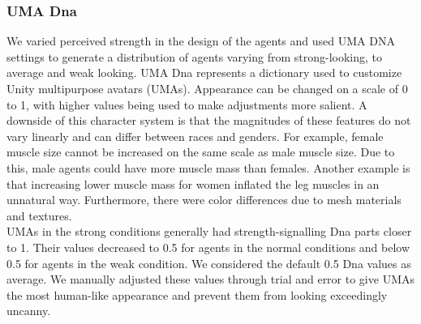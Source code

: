 \subsubsection{UMA Dna}
We varied perceived strength in the design of the agents and used UMA DNA settings to generate a distribution of agents varying from strong-looking, to average and weak looking. UMA Dna represents a dictionary used to customize Unity multipurpose avatars (UMAs). Appearance can be changed on a scale of 0 to 1, with higher values being used to make adjustments more salient. A downside of this character system is that the magnitudes of these features do not vary linearly and can differ between races and genders. For example, female muscle size cannot be increased on the same scale as male muscle size. Due to this, male agents could have more muscle mass than females. Another example is that increasing lower muscle mass for women inflated the leg muscles in an unnatural way. Furthermore, there were color differences due to mesh materials and textures. 
\\
UMAs in the strong conditions generally had strength-signalling Dna parts closer to 1. Their values decreased to 0.5 for agents in the normal conditions and below 0.5 for agents in the weak condition. We considered the default 0.5 Dna values as average. We manually adjusted these values through trial and error to give UMAs the most human-like appearance and prevent them from looking exceedingly uncanny.    
